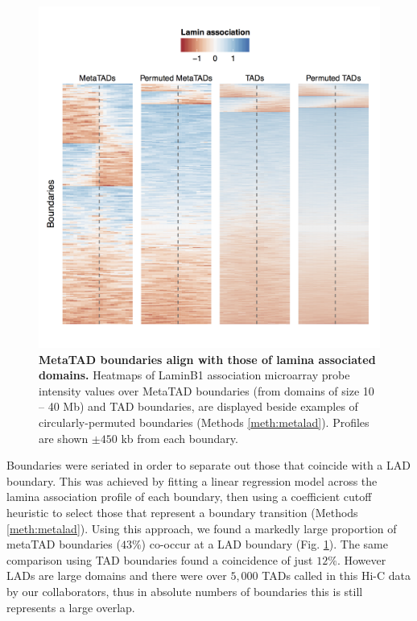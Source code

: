 \documentclass[a4paper,11pt,oneside]{book}
\begin{document}
\begin{figure}
\begin{center} 
\includegraphics[width=4.5in]{figs/mt_laminperm.png}
\captionsetup{width=\textwidth}
\caption[MetaTAD boundaries align with those of lamina associated domains.]{ {\bf MetaTAD boundaries align with those of lamina associated domains.}
Heatmaps of LaminB1 association microarray probe intensity values over MetaTAD boundaries (from domains of size 10 -- 40 Mb) and TAD boundaries, are displayed beside examples of circularly-permuted boundaries (Methods \ref{meth:metalad}). Profiles are shown $\pm450$ kb from each boundary.
}\label{fig:mtlamin}
\end{center}
\end{figure} 

Boundaries were seriated in order to separate out those that coincide with a LAD boundary. This was achieved by fitting a linear regression model across the lamina association profile of each boundary, then using a coefficient cutoff heuristic to select those that represent a boundary transition (Methods \ref{meth:metalad}).  Using this approach, we found a markedly large proportion of metaTAD boundaries ($43\%$) co-occur at a LAD boundary (Fig. \ref{fig:mtlamin}). The same comparison using TAD boundaries found a coincidence of just $12\%$. However LADs are large domains and there were over $5,000$ TADs called in this Hi-C data by our collaborators, thus in absolute numbers of boundaries this is still represents a large overlap.
\end{document}
